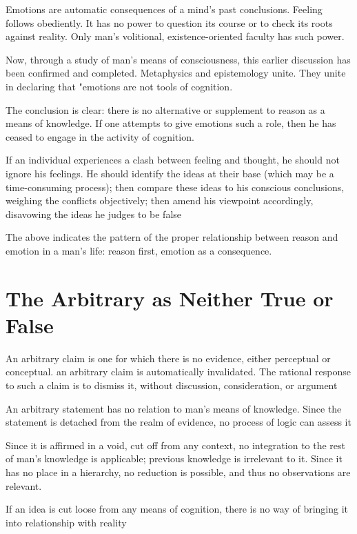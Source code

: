         Emotions are automatic consequences of a mind's past conclusions. Feeling follows obediently. It has no power to question its course or to check its roots against reality. Only man's volitional, existence-oriented faculty has such power.
        
        Now, through a study of man's means of consciousness, this earlier discussion has been confirmed and completed. Metaphysics and epistemology unite. They unite in declaring that "emotions are not tools of cognition.
        
        The conclusion is clear: there is no alternative or supplement to reason as a means of knowledge. If one attempts to give emotions such a role, then he has ceased to engage in the activity of cognition.
        
        If an individual experiences a clash between feeling and thought, he should not ignore his feelings. He should identify the ideas at their base (which may be a time-consuming process); then compare these ideas to his conscious conclusions, weighing the conflicts objectively; then amend his viewpoint accordingly, disavowing the ideas he judges to be false
        
        The above indicates the pattern of the proper relationship between reason and emotion in a man's life: reason first, emotion as a consequence.

    \section{The Arbitrary as Neither True or False}
    
        An arbitrary claim is one for which there is no evidence, either perceptual or conceptual. an arbitrary claim is automatically invalidated. The rational response to such a claim is to dismiss it, without discussion, consideration, or argument
        
        An arbitrary statement has no relation to man's means of knowledge. Since the statement is detached from the realm of evidence, no process of logic can assess it
        
        Since it is affirmed in a void, cut off from any context, no integration to the rest of man's knowledge is applicable; previous knowledge is irrelevant to it. Since it has no place in a hierarchy, no reduction is possible, and thus no observations are relevant.
        
        If an idea is cut loose from any means of cognition, there is no way of bringing it into relationship with reality
        
